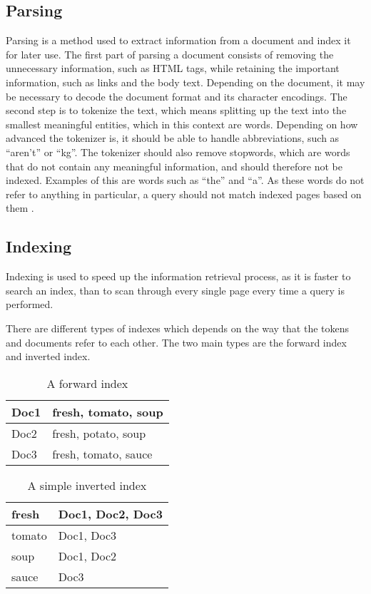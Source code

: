 \subsection{Parsing} \label{sec:parsing}
Parsing is a method used to extract information from a document and
index it for later use. The first part of parsing a document consists of
removing the unnecessary information, such as HTML tags, while retaining the
important information, such as links and the body text. Depending on the
document, it may be necessary to decode the document format and its character
encodings. 
The second step is to tokenize the text, which means splitting up
the text into the smallest meaningful entities, which in this context are
words. Depending on how advanced the tokenizer is, it should be able to handle
abbreviations, such as ``aren't'' or ``kg''. The tokenizer should also remove
stopwords, which are words that do not contain any meaningful information,
and should therefore not be indexed. Examples of this are words such as ``the''
and ``a''. As these words do not refer to anything in particular, a query should
not match indexed pages based on them \citep[Ch.
2]{manning2008introduction}.

\subsection{Indexing}
Indexing is used to speed up the information retrieval process, as it is faster
to search an index, than to scan through every single page every time a query is
performed.

There are different types of indexes which depends on the way that the tokens
and documents refer to each other. The two main types are the forward index and
inverted index.

\begin{minipage}{.40\textwidth}
  \centering
  \begin{table}[H]
	\centering
    \begin{tabular}{|l|l|}
\hline
Doc1 & fresh, tomato, soup \\ \hline
Doc2 & fresh, potato, soup \\ \hline
Doc3 & fresh, tomato, sauce \\ \hline
	\end{tabular}
	\label{fIndex}
	\caption{A forward index}
  \end{table}
\end{minipage}
\begin{minipage}{0.5\textwidth}
  \centering
  \begin{table}[H]
	\centering
    \begin{tabular}{|l|l|}
\hline
fresh & Doc1, Doc2, Doc3 \\ \hline
tomato & Doc1, Doc3 \\ \hline
soup & Doc1, Doc2 \\ \hline
sauce & Doc3 \\ \hline
	\end{tabular}
	\label{iIndex}
	\caption{A simple inverted index}
  \end{table}

\end{minipage}

